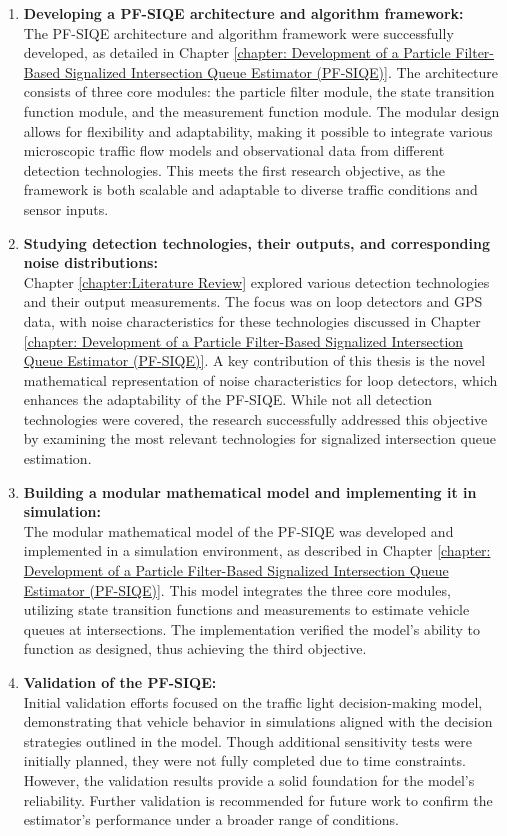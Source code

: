 \begin{enumerate}
    \item \textbf{Developing a PF-SIQE architecture and algorithm framework:} \\
    The PF-SIQE architecture and algorithm framework were successfully developed, as detailed in Chapter \ref{chapter: Development of a Particle Filter-Based Signalized Intersection Queue Estimator (PF-SIQE)}. The architecture consists of three core modules: the particle filter module, the state transition function module, and the measurement function module. The modular design allows for flexibility and adaptability, making it possible to integrate various microscopic traffic flow models and observational data from different detection technologies. This meets the first research objective, as the framework is both scalable and adaptable to diverse traffic conditions and sensor inputs.

    \item \textbf{Studying detection technologies, their outputs, and corresponding noise distributions:} \\
    Chapter \ref{chapter:Literature Review} explored various detection technologies and their output measurements. The focus was on loop detectors and GPS data, with noise characteristics for these technologies discussed in Chapter \ref{chapter: Development of a Particle Filter-Based Signalized Intersection Queue Estimator (PF-SIQE)}. A key contribution of this thesis is the novel mathematical representation of noise characteristics for loop detectors, which enhances the adaptability of the PF-SIQE. While not all detection technologies were covered, the research successfully addressed this objective by examining the most relevant technologies for signalized intersection queue estimation.

    \item \textbf{Building a modular mathematical model and implementing it in simulation:} \\
    The modular mathematical model of the PF-SIQE was developed and implemented in a simulation environment, as described in Chapter \ref{chapter: Development of a Particle Filter-Based Signalized Intersection Queue Estimator (PF-SIQE)}. This model integrates the three core modules, utilizing state transition functions and measurements to estimate vehicle queues at intersections. The implementation verified the model's ability to function as designed, thus achieving the third objective.

    \item \textbf{Validation of the PF-SIQE:} \\
    Initial validation efforts focused on the traffic light decision-making model, demonstrating that vehicle behavior in simulations aligned with the decision strategies outlined in the model. Though additional sensitivity tests were initially planned, they were not fully completed due to time constraints. However, the validation results provide a solid foundation for the model's reliability. Further validation is recommended for future work to confirm the estimator’s performance under a broader range of conditions.
\end{enumerate}


